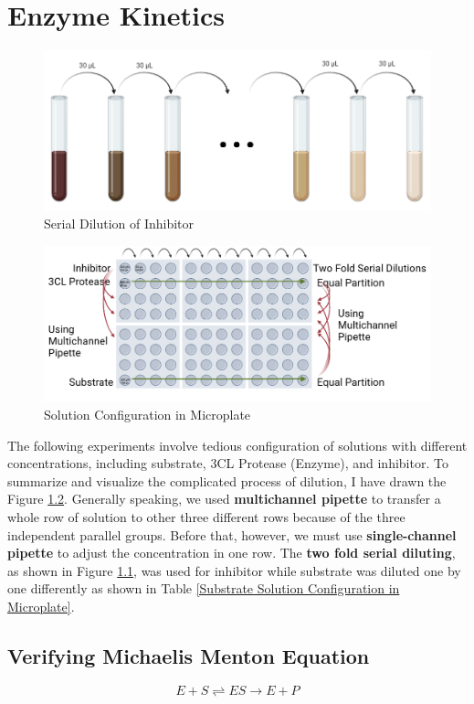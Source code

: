 \documentclass{report}
\begin{document}
\chapter{Enzyme Kinetics}
\begin{figure}
    \centering
    \includegraphics[width=0.7\linewidth]{../Figures/serial dilution.png}
    \caption{Serial Dilution of Inhibitor}
    \label{Serial Dilution of Inhibitor}
\end{figure}
\begin{figure}
    \centering
    \includegraphics[width=1\linewidth]{../Figures/microplate.png}
    \caption{Solution Configuration in Microplate}
    \label{Inhibitor Solution Configuration in Microplate}
\end{figure}
The following experiments involve tedious configuration of solutions with different concentrations, including substrate, 3CL Protease (Enzyme), and inhibitor.
To summarize and visualize the complicated process of dilution, I have drawn the Figure \ref{Inhibitor Solution Configuration in Microplate}.
Generally speaking, we used \textbf{multichannel pipette} to transfer a whole row of solution to other three different rows because of the three independent parallel groups.
Before that, however, we must use \textbf{single-channel pipette} to adjust the concentration in one row.
The \textbf{two fold serial diluting}, as shown in Figure \ref{Serial Dilution of Inhibitor}, was used for inhibitor while substrate was diluted one by one differently as shown in Table \ref{Substrate Solution Configuration in Microplate}.

\section{Verifying Michaelis Menton Equation}
$$
E + S \rightleftharpoons ES \rightarrow E+P
$$
\end{document}
